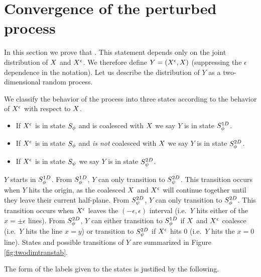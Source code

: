 {
\section{Convergence of the perturbed process}
\label{sec:proof-of-lem:resamplede-to-sampled}

\newcommand{\statenoweb}{S^{2D}_{\indepbm}}
\newcommand{\statewebapart}{S^{2D}_{\webnoargs}}
\newcommand{\statewebtogether}{S^{1D}_{\webnoargs}}
\newcommand{\twodim}{Y}

In this section we prove that
\statementoflemresampledetosampled{}.  This statement depends only on the
joint distribution of $X$ and $X^{\epsilon}$.
We therefore define $\twodim=(\resamplede, \sampled)$ (suppressing
the $\epsilon$ dependence in the notation). Let us describe the distribution of
$\twodim$
 as a two-dimensional random process.

We classify the behavior of the process into three states according to
the behavior of $X^{\epsilon}$ with respect to $X$.
\begin{itemize}
\item If $X^{\epsilon}$ is in state $S_{\phi}$
and is coalesced with $X$ we say $\twodim$ is in
state $\statewebtogether$.
\item If $X^{\epsilon}$ is in state $S_{\phi}$
and \emph{is not} coalesced with $X$ we say $\twodim$ is in state $\statewebapart$.
\item If $X^{\epsilon}$ is in state $S_{\psi}$
we say $\twodim$ is in state $\statenoweb$.
\end{itemize}
$\twodim$ starts
in $\statewebtogether$.  From $\statewebtogether$, $\twodim$
can only transition to $\statenoweb$.
This transition occurs when $\twodim$ hits the origin, as the coalesced
$X$ and $X^{\epsilon}$ will continue together until they leave their
current half-plane.
From $\statenoweb$, $\twodim$ can only transition to
$\statewebapart$.  This transition occurs when $X^{\epsilon}$
leaves the $(-\epsilon,\epsilon)$
interval (i.e.\ $\twodim$ hits either of the $x=\pm\epsilon$ lines).
From
$\statewebapart$, $\twodim$ can either transition to $\statewebtogether$
if $X$ and $X^{\epsilon}$ coalesce (i.e.\ $\twodim$ hits the line $x=y$)
or transition to $\statenoweb$ if $X^{\epsilon}$ hits $0$ (i.e.\ $\twodim$ hits
the $x=0$ line).
States and possible transitions of $\twodim$ are summarized in Figure
\ref{fig:twodimtranstab}.

The form of the labels given to the states is justified by the following.

}
